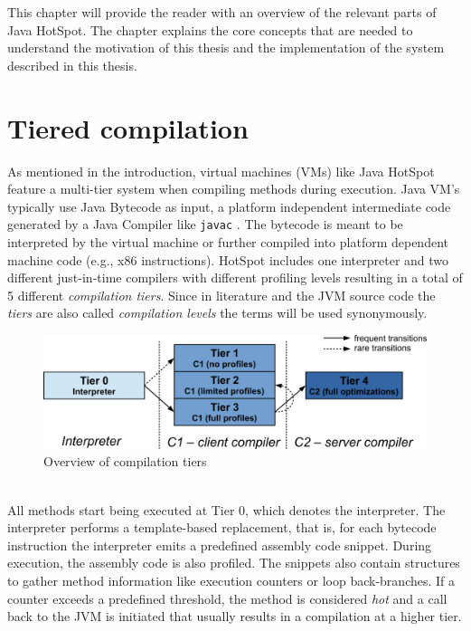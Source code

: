 This chapter will provide the reader with an overview of the relevant parts of Java HotSpot. The chapter explains the core concepts that are needed to understand the motivation of this thesis and the implementation of the system described in this thesis.

\section{Tiered compilation}
\label{sec:tiered}
As mentioned in the introduction, virtual machines (VMs) like Java HotSpot feature a multi-tier system when compiling methods during execution. 
Java VM's typically use Java Bytecode as input, a platform independent intermediate code generated by a Java Compiler like \texttt{javac} \cite{javac}.
The bytecode is meant to be interpreted by the virtual machine or further compiled into platform dependent machine code (e.g., x86 instructions).
HotSpot includes one interpreter and two different just-in-time compilers with different profiling levels resulting in a total of 5 different \textit{compilation tiers}. Since in literature and the JVM source code the \textit{tiers} are also called \textit{compilation levels} the terms will be used synonymously. 
\begin{figure}[ht]
  \begin{center}
    \centering
    \includegraphics{figures/hs_tiers.png}
    \caption{Overview of compilation tiers}
    \label{f:hs_tiers}
  \end{center}
\end{figure}
\\
All methods start being executed at Tier 0, which denotes the interpreter.
The interpreter performs a template-based replacement, that is, for each bytecode instruction the interpreter emits a predefined assembly code snippet.
During execution, the assembly code is also profiled. The snippets also contain structures to gather method information like execution counters or loop back-branches. If a counter exceeds a predefined threshold, the method is considered \textit{hot} and a call back to the JVM is initiated that usually results in a compilation at a higher tier.
